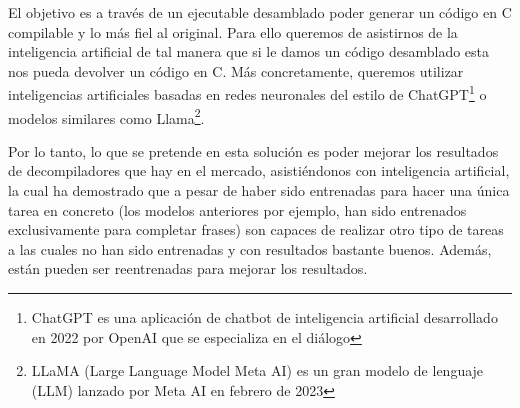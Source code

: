 El objetivo es a través de un ejecutable desamblado poder generar un código en C compilable
y lo más fiel al original. Para ello queremos de asistirnos de la inteligencia artificial
de tal manera que si le damos un código desamblado esta nos pueda devolver un código en C.
Más concretamente, queremos utilizar inteligencias artificiales basadas en redes neuronales
del estilo de ChatGPT\footnote{ChatGPT es una aplicación de chatbot de inteligencia artificial
desarrollado en 2022 por OpenAI que se especializa en el diálogo} o modelos similares como 
Llama\footnote{LLaMA (Large Language Model Meta AI) es un gran modelo de lenguaje (LLM) 
lanzado por Meta AI en febrero de 2023}.

Por lo tanto, lo que se pretende en esta solución es poder mejorar los resultados de decompiladores
que hay en el mercado, asistiéndonos con inteligencia artificial, la cual ha demostrado
que a pesar de haber sido entrenadas para hacer una única tarea en concreto (los modelos anteriores
por ejemplo, han sido entrenados exclusivamente para completar frases) son capaces de
realizar otro tipo de tareas a las cuales no han sido entrenadas y con resultados bastante buenos.
Además, están pueden ser reentrenadas para mejorar los resultados.
